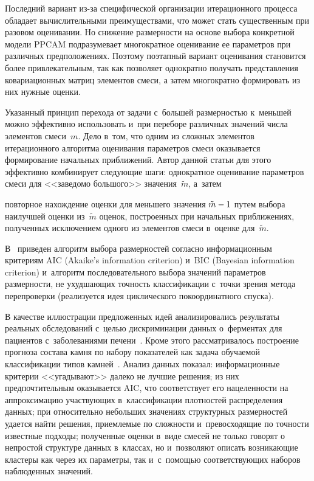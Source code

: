 \begin{multicols}{2}
     Последний вариант из-за специфической организации итерационного 
процесса обладает вычислительными преимуществами, что может стать 
существенным при разовом оценивании. Но снижение размерности на основе 
выбора конкретной модели PPCAM подразумевает многократное оценивание ее 
параметров при различных предположениях. Поэтому поэтапный вариант 
оценивания становится более привлекательным, так как позволяет однократно 
получать представления ковариационных матриц элементов смеси, а затем 
многократно формировать из них нужные оценки. 
     
     Указанный принцип перехода от задачи с~большей размерностью 
к~меньшей можно эффективно использовать и~при переборе различных 
значений числа элементов смеси~$m$. Дело в~том, что одним из сложных 
элементов итерационного алгоритма оценивания параметров смеси оказывается 
формирование начальных приближений. Автор данной статьи для этого 
эффективно комбинирует следующие шаги: однократное оценивание 
параметров смеси для <<заведомо большого>> значения~$\tilde{m}$, а~затем\linebreak\vspace*{-12pt}

\columnbreak

\noindent 
повторное нахождение оценки для меньшего значения $\tilde{m}\hm-1$ путем 
выбора наилучшей оценки из~$\tilde{m}$ оценок, построенных при начальных 
приближениях, полученных исключением одного из элементов смеси в~оценке 
для~$\tilde{m}$.
     
     В~\cite{6-kri} приведен алгоритм выбора размерностей согласно 
информационным критериям AIC (Akaike's information criterion)
и~BIC (Bayesian information criterion) и~алгоритм последовательного выбора 
значений параметров размерности, не ухудшающих точность классификации 
с~точки зрения метода перепроверки (реализуется идея циклического 
покоординатного спуска). 
     
     В качестве иллюстрации предложенных идей анализировались 
результаты реальных обследований с~целью дискриминации данных 
о~ферментах для пациентов с~заболеваниями печени~\cite{7-kri}. Кроме этого 
рассматривалось построение прогноза состава камня по набору показателей как 
задача обуча\-емой классификации типов камней~\cite{6-kri}. Анализ данных 
показал: информационные критерии <<угадывают>> далеко не лучшие 
решения; из них предпочтительным оказывается AIC, что соответствует его 
нацеленности на аппроксимацию участ\-ву\-ющих в~классификации плотностей 
распределения данных; при относительно небольших значениях структурных 
размерностей удается найти решения, приемлемые по сложности 
и~превосходящие по точности известные подходы; полученные оценки в~виде 
смесей не только говорят о непростой структуре данных в~классах, но 
и~позволяют описать возникающие кластеры как через их параметры, так 
и~с~помощью соответствующих наборов наблюденных значений.
     

\end{multicols}
